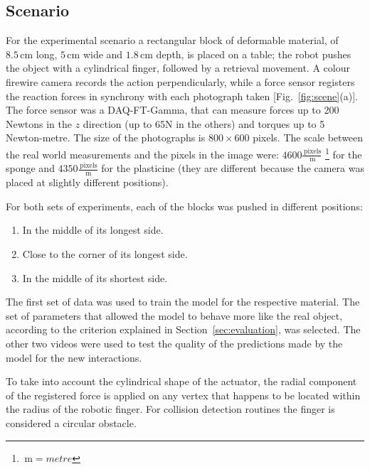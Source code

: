 \documentclass[journal]{IEEEtran}
\newcommand{\fref}[1]{Fig.~\ref{#1}}
\newcommand{\sref}[1]{Section~\ref{#1}}
\newcommand{\unit}[1]{\ensuremath{\, \mathrm{#1}}}
\begin{document}
\subsection{Scenario}
For the experimental scenario a rectangular block of deformable material, of $8.5 \unit{cm}$ long, $5 \unit{cm}$ wide and $1.8 \unit{cm}$ depth, is placed on a table; the robot pushes the object with a cylindrical finger, followed by a retrieval movement.  A colour firewire camera records the action perpendicularly, while a force sensor registers the reaction forces in synchrony with each photograph taken [\fref{fig:scene}(a)].  The force sensor was a DAQ-FT-Gamma, that can measure forces up to 200 Newtons in the $z$ direction (up to 65N in the others) and torques up to 5 Newton-metre.  The size of the photographs is $800 \times 600$ pixels.  The scale between the real world measurements and the pixels in the image were: $4600\frac{\unit{pixels}}{\unit{m}}$ \footnote{$\unit{m}=metre$} for the sponge and $4350\frac{\unit{pixels}}{\unit{m}}$ for the plasticine (they are different because the camera was placed at slightly different positions).

For both sets of experiments, each of the blocks was pushed in different positions:
\begin{enumerate}
 \item In the middle of its longest side.
 \item Close to the corner of its longest side.
 \item In the middle of its shortest side.
\end{enumerate}
The first set of data was used to train the model for the respective material.  The set of parameters that allowed the model to behave more like the real object, according to the criterion explained in \sref{sec:evaluation}, was selected.  The other two videos were used to test the quality of the predictions made by the model for the new interactions.

To take into account the cylindrical shape of the actuator, the radial component of the registered force is applied on any vertex that happens to be located within the radius of the robotic finger.  For collision detection routines the finger is considered a circular obstacle.
\end{document}
